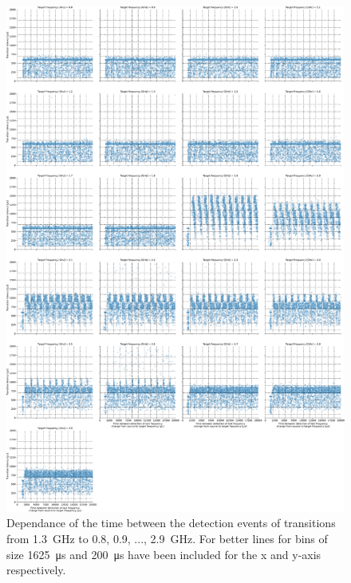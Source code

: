 \begin{figure}[]
    \centering
    \includegraphics[width=\columnwidth]{fig/ftalat_scatter_wait_transition_latency_hati_source_1.3.pdf}
    \caption{Dependance of the time between the detection events of transitions from \SI{1.3}{\GHz} to \SI{0.8}{}, \SI{0.9}{}, ..., \SI{2.9}{\GHz}. For better lines for bins of size \SI{1625}{\us} and \SI{200}{\us} have been included for the x and y-axis respectively.}
\end{figure}
